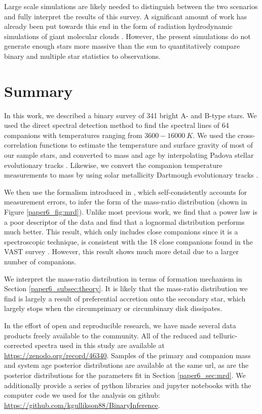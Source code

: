Large scale simulations are likely needed to distinguish between the two scenarios and fully interpret the results of this survey. A significant amount of work has already been put towards this end in the form of radiation hydrodynamic simulations of giant molecular clouds \citep{Bate2012, Krumholz2012}. However, the present simulations do not generate enough stars more massive than the sun to quantitatively compare binary and multiple star statistics to observations. 


\section{Summary}

In this work, we described a binary survey of 341 bright A- and B-type stars. We used the direct spectral detection method \citep{Gullikson2016} to find the spectral lines of 64 companions with temperatures ranging from $3600 - 16000\ K$.  We used the cross-correlation functions to estimate the temperature and surface gravity of most of our sample stars, and converted to mass and age by interpolating Padova stellar evolutionary tracks \citep{Bressan2012}. Likewise, we convert the companion temperature measurements to mass by using solar metallicity Dartmough evolutionary tracks \citep{Dotter2008}. 

We then use the formalism introduced in \citet{Foreman2014}, which self-consistently accounts for measurement errors, to infer the form of the mass-ratio distribution (shown in Figure \ref{paper6_fig:mrd}). Unlike most previous work, we find that a power law is a poor descriptor of the data and find that a lognormal distribution performs much better. This result, which only includes close companions since it is a spectroscopic technique, is consistent with the 18 close companions found in the VAST survey \citep{DeRosa2014}. However, this result shows much more detail due to a larger number of companions. 

We interpret the mass-ratio distribution in terms of formation mechanism in Section \ref{paper6_subsec:theory}. It is likely that the mass-ratio distribution we find is largely a result of preferential accretion onto the secondary star, which largely stops when the circumprimary or circumbinary disk dissipates.

In the effort of open and reproducible research, we have made several data products freely available to the community. All of the reduced and telluric-corrected spectra used in this study are available at \url{https://zenodo.org/record/46340}. Samples of the primary and companion mass and system age posterior distributions are available at the same url, as are the posterior distributions for the parameters fit in Section \ref{paper6_sec:mrd}. We additionally provide a series of python libraries and jupyter notebooks with the computer code we used for the analysis on github: \url{https://github.com/kgullikson88/BinaryInference}.




